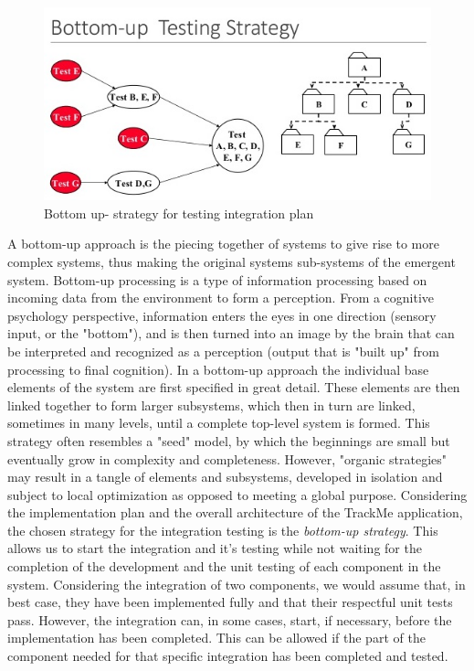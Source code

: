 \begin{figure}[H]
	\begin{center}
		\includegraphics[width=\textwidth]{./DD_Diagrams/testplan2.jpg}
      \caption{Bottom up- strategy for testing integration plan}
        \label{TrackMe_tp2}
	\end{center}
\end{figure}
A bottom-up approach is the piecing together of systems to give rise to more complex systems, thus making the original systems sub-systems of the emergent system. Bottom-up processing is a type of information processing based on incoming data from the environment to form a perception. From a cognitive psychology perspective, information enters the eyes in one direction (sensory input, or the "bottom"), and is then turned into an image by the brain that can be interpreted and recognized as a perception (output that is "built up" from processing to final cognition). In a bottom-up approach the individual base elements of the system are first specified in great detail. These elements are then linked together to form larger subsystems, which then in turn are linked, sometimes in many levels, until a complete top-level system is formed. This strategy often resembles a "seed" model, by which the beginnings are small but eventually grow in complexity and completeness. However, "organic strategies" may result in a tangle of elements and subsystems, developed in isolation and subject to local optimization as opposed to meeting a global purpose.\newline
Considering the implementation plan and the overall architecture of the TrackMe application, the chosen strategy for the integration testing is the \textit{bottom-up strategy}. This allows us to start the integration and it’s testing while not waiting for the completion of the development and the unit testing of each component in the system. Considering the integration of two components, we would assume that, in best case, they have been implemented fully and that their respectful unit tests pass. However, the integration can, in some cases, start, if necessary, before the implementation has been completed. This can be allowed if the part of the component needed for that specific integration has been completed and tested. \newline

